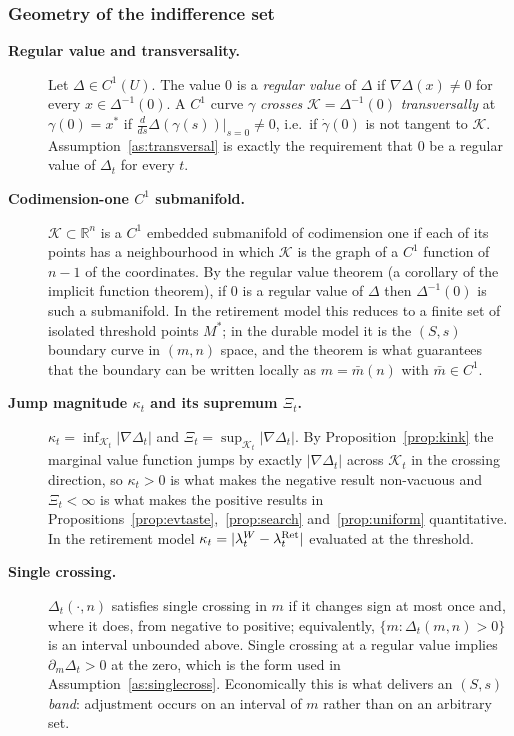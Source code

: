 \subsubsection{Geometry of the indifference set}

\begin{description}

\item[\textnormal{\textbf{Regular value and transversality.}}]
Let $\Delta\in C^{1}(U)$. The value $0$ is a \emph{regular value} of $\Delta$ if
$\nabla\Delta(x)\neq0$ for every $x\in\Delta^{-1}(0)$. A $C^{1}$ curve $\gamma$
\emph{crosses} $\mathcal{K}=\Delta^{-1}(0)$ \emph{transversally} at $\gamma(0)=x^{\ast}$
if $\tfrac{d}{ds}\Delta(\gamma(s))\big|_{s=0}\neq0$, i.e.\ if $\dot\gamma(0)$ is not
tangent to $\mathcal{K}$. Assumption~\ref{as:transversal} is exactly the requirement
that $0$ be a regular value of $\Delta_t$ for every $t$.

\item[\textnormal{\textbf{Codimension-one $C^{1}$ submanifold.}}]
$\mathcal{K}\subset\mathbb{R}^{n}$ is a $C^{1}$ embedded submanifold of codimension one
if each of its points has a neighbourhood in which $\mathcal{K}$ is the graph of a
$C^{1}$ function of $n-1$ of the coordinates. By the regular value theorem (a corollary
of the implicit function theorem), if $0$ is a regular value of $\Delta$ then
$\Delta^{-1}(0)$ is such a submanifold. In the retirement model this reduces to a
finite set of isolated threshold points $M^{\ast}$; in the durable model it is the
$(S,s)$ boundary curve in $(m,n)$ space, and the theorem is what guarantees that the
boundary can be written locally as $m=\bar m(n)$ with $\bar m\in C^{1}$.

\item[\textnormal{\textbf{Jump magnitude $\kappa_t$ and its supremum $\Xi_t$.}}]
$\kappa_t=\inf_{\mathcal{K}_t}\lvert\nabla\Delta_t\rvert$ and
$\Xi_t=\sup_{\mathcal{K}_t}\lvert\nabla\Delta_t\rvert$. By
Proposition~\ref{prop:kink} the marginal value function jumps by exactly
$\lvert\nabla\Delta_t\rvert$ across $\mathcal{K}_t$ in the crossing direction, so
$\kappa_t>0$ is what makes the negative result non-vacuous and $\Xi_t<\infty$ is what
makes the positive results in Propositions~\ref{prop:evtaste},~\ref{prop:search}
and~\ref{prop:uniform} quantitative. In the retirement model
$\kappa_t=\lvert\lambda_t^{W}-\lambda_t^{\mathrm{Ret}}\rvert$ evaluated at the threshold.

\item[\textnormal{\textbf{Single crossing.}}]
$\Delta_t(\cdot,n)$ satisfies single crossing in $m$ if it changes sign at most once and,
where it does, from negative to positive; equivalently, $\{m:\Delta_t(m,n)>0\}$ is an
interval unbounded above. Single crossing at a regular value implies
$\partial_m\Delta_t>0$ at the zero, which is the form used in
Assumption~\ref{as:singlecross}. Economically this is what delivers an $(S,s)$
\emph{band}: adjustment occurs on an interval of $m$ rather than on an arbitrary set.

\end{description}

